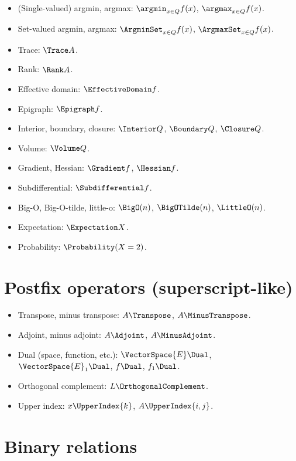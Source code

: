\documentclass{article}
\begin{document}
  \begin{itemize}
    \item (Single-valued) argmin, argmax: $\argmin_{x \in Q} f(x)$, $\argmax_{x \in Q} f(x)$.
    \item Set-valued argmin, argmax: $\ArgminSet_{x \in Q} f(x)$, $\ArgmaxSet_{x \in Q} f(x)$.
    \item Trace: $\Trace A$.
    \item Rank: $\Rank A$.
    \item Effective domain: $\EffectiveDomain f$.
    \item Epigraph: $\Epigraph f$.
    \item Interior, boundary, closure: $\Interior Q$, $\Boundary Q$, $\Closure Q$.
    \item Volume: $\Volume Q$.
    \item Gradient, Hessian: $\Gradient f$, $\Hessian f$.
    \item Subdifferential: $\Subdifferential f$.
    \item Big-O, Big-O-tilde, little-o: $\BigO(n)$, $\BigOTilde(n)$, $\LittleO(n)$.
    \item Expectation: $\Expectation X$.
    \item Probability: $\Probability(X = 2)$.
  \end{itemize}

  \section{Postfix operators (superscript-like)}

  \begin{itemize}
    \item Transpose, minus transpose: $A\Transpose$, $A\MinusTranspose$.
    \item Adjoint, minus adjoint: $A\Adjoint$, $A\MinusAdjoint$.
    \item Dual (space, function, etc.): $\VectorSpace{E}\Dual$, $\VectorSpace{E}_1\Dual$, $f\Dual$, $f_1\Dual$.
    \item Orthogonal complement: $L\OrthogonalComplement$.
    \item Upper index: $x\UpperIndex{k}$, $A\UpperIndex{i, j}$.
  \end{itemize}

  \section{Binary relations}
\end{document}
